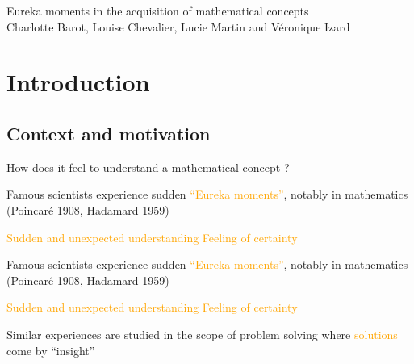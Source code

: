 \documentclass[11pt, pdflatex, compress]{beamer}
\begin{document}
{ {\textcolor{back}{Eureka moments in the acquisition of mathematical concepts}}\\
        {\small {\textcolor{back}{Charlotte Barot, Louise Chevalier, Lucie Martin and  V\'{e}ronique Izard }}}\\
        
        }

        



        




     \begin{frame}
      \titlepage
     \end{frame}


           


\small
\section{Introduction}


\subsection{Context and motivation}

\begin{frame}

\centering
How does it feel to understand a mathematical concept ?

\end{frame}

\begin{frame}




Famous scientists experience sudden \textcolor{orange}{``Eureka moments''}, notably in mathematics (Poincar\'{e} 1908, Hadamard 1959)

 \textcolor{orange}{Sudden and unexpected understanding}
 \textcolor{orange}{Feeling of certainty}



\end{frame}


\begin{frame}



 Famous scientists experience sudden \textcolor{orange}{``Eureka moments''}, notably in mathematics (Poincar\'{e} 1908, Hadamard 1959)

      \textcolor{orange}{Sudden and unexpected understanding}
     \textcolor{orange}{Feeling of certainty}
  

\ite Similar experiences are studied in the scope of problem solving where \textcolor{orange}{solutions} come by ``insight''

\en

  
\end{frame}
\end{document}
